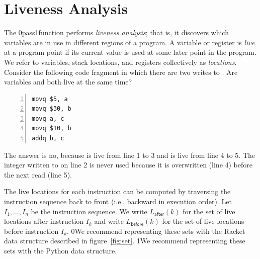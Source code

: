 \documentclass[7x10]{TimesAPriori_MIT}%
\def\racketEd{0}
\def\pythonEd{1}
\def\edition{0}
\newcommand{\racket}[1]{{\if\edition\racketEd{#1}\fi}}
\newcommand{\python}[1]{{\if\edition\pythonEd #1\fi}}
\numberwithin{theorem}{chapter}
\numberwithin{definition}{chapter}
\numberwithin{equation}{chapter}
\begin{document}

\section{Liveness Analysis}
\label{sec:liveness-analysis-Lvar}

The  \racket{pass}\python{function} performs
\emph{liveness analysis}; that is, it discovers which variables are
in use in different regions of a program.
%
A variable or register is \emph{live} at a program point if its
current value is used at some later point in the program.  We refer to
variables, stack locations, and registers collectively as
\emph{locations}.
%
Consider the following code fragment in which there are two writes to
. Are variables  and  both live at the same
time?
\begin{center}
  \begin{minipage}{0.96\textwidth}
\begin{lstlisting}[numbers=left,numberstyle=\tiny]
movq $5, a
movq $30, b
movq a, c
movq $10, b
addq b, c
\end{lstlisting}
\end{minipage}
\end{center}
The answer is no, because  is live from line 1 to 3 and
 is live from line 4 to 5.  The integer written to  on
line 2 is never used because it is overwritten (line 4) before the
next read (line 5).

The live locations for each instruction can be computed by traversing
the instruction sequence back to front (i.e., backward in execution
order).  Let $I_1,\ldots, I_n$ be the instruction sequence. We write
$L_{\mathsf{after}}(k)$ for the set of live locations after
instruction $I_k$ and write $L_{\mathsf{before}}(k)$ for the set of live
locations before instruction $I_k$.  \racket{We recommend representing
  these sets with the Racket  data structure described in
  figure~\ref{fig:set}.}  \python{We recommend representing these sets
  with the Python
  \href{https://docs.python.org/3.10/library/stdtypes.html\#set-types-set-frozenset}{\code{set}}
  data structure.}
\end{document}
